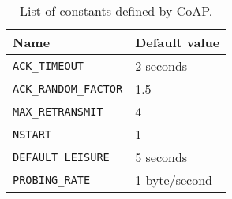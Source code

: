 	\begin{table}[h!]
		\begin{center}
			\begin{tabular}{|l|l|}
				\hline
				\textbf{Name} & \textbf{Default value}\\\hline
					\texttt{ACK\_TIMEOUT} &	2 seconds\\\hline
					\texttt{ACK\_RANDOM\_FACTOR} & 1.5 \\\hline
					\texttt{MAX\_RETRANSMIT} & 4 \\\hline
					\texttt{NSTART} & 1 \\\hline
					\texttt{DEFAULT\_LEISURE} &	5 seconds \\\hline
					\texttt{PROBING\_RATE} & 1 byte/second \\\hline
			\end{tabular}
			\caption{List of constants defined by CoAP.}
			\label{tab:table3}
		\end{center}
	\end{table}